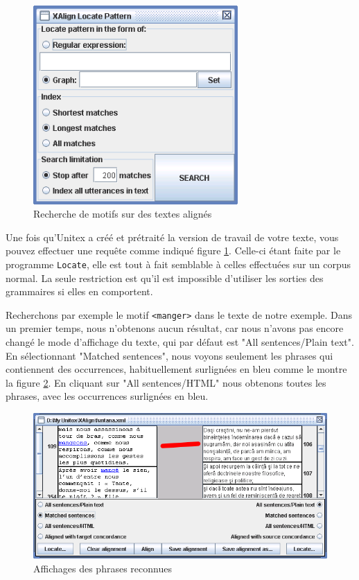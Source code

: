 \begin{figure}[!ht]
\begin{center}
\includegraphics[width=7.8cm]{resources/img/figX-7.png}
\caption{Recherche de motifs sur des textes alignés\label{fig-x-locate-frame}}
\end{center}
\end{figure}

\bigskip
\noindent Une fois qu'Unitex a créé et prétraité la version de travail de votre texte, vous pouvez
effectuer une requête comme indiqué figure \ref{fig-x-locate-frame}. Celle-ci étant faite par le
programme \verb+Locate+, elle est tout à fait semblable à celles effectuées sur
un corpus normal. La seule restriction est qu'il est impossible d'utiliser les sorties des
grammaires si elles en comportent.


\bigskip
\noindent Recherchons par exemple le motif \verb+<manger>+ dans le  texte de notre exemple. Dans un
premier temps, nous n'obtenons aucun résultat, car nous n'avons pas encore changé le mode
d'affichage du texte, qui par  défaut est "All sentences/Plain text". En sélectionnant "Matched
sentences", nous voyons seulement les phrases qui contiennent des occurrences, habituellement
surlignées en bleu comme le montre la figure \ref{fig-x-concord}. En cliquant sur "All
sentences/HTML" nous obtenons toutes les phrases, avec les occurrences surlignées en bleu.

\begin{figure}[!ht]
\begin{center}
\includegraphics[width=15.5cm]{resources/img/figX-8.png}
\caption{Affichages des phrases reconnues\label{fig-x-concord}}
\end{center}
\end{figure}

